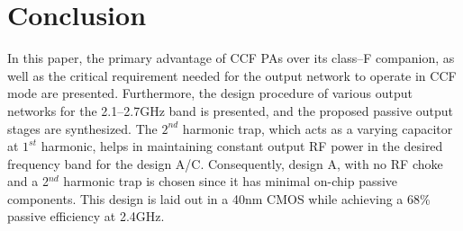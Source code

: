 \documentclass[conference]{IEEEtran}
\begin{document}
\section{Conclusion}
\label{section:Conclusion}
In this paper, the primary advantage of CCF PAs over its class--F companion, as well as the critical requirement needed for the output network to operate in CCF mode are presented. Furthermore, the design procedure of various output networks for the 2.1--2.7GHz band is presented, and the proposed passive output stages are synthesized.  
The $2^{nd}$ harmonic trap, which acts as a varying capacitor at $1^{st}$ harmonic, helps in maintaining constant output RF power in the desired frequency band for the design A/C. Consequently, design A, with no RF choke and a 2$^{nd}$ harmonic trap is chosen since it has minimal on-chip passive components. This design is laid out in a 40nm CMOS while achieving a 68\% passive efficiency at 2.4GHz.



\end{document}
